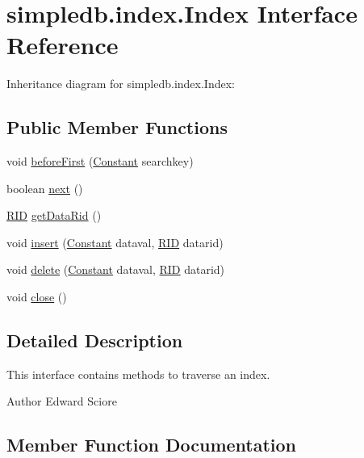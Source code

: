 \hypertarget{interfacesimpledb_1_1index_1_1Index}{}\section{simpledb.\+index.\+Index Interface Reference}
\label{interfacesimpledb_1_1index_1_1Index}


Inheritance diagram for simpledb.\+index.\+Index\+:
\subsection*{Public Member Functions}
\begin{DoxyCompactItemize}
\item 
void \hyperlink{interfacesimpledb_1_1index_1_1Index_a393ce322b5a7ffee20d8ff85abef7444}{before\+First} (\hyperlink{classsimpledb_1_1query_1_1Constant}{Constant} searchkey)
\item 
boolean \hyperlink{interfacesimpledb_1_1index_1_1Index_a38b2addb6813fbf1d94e77de2345724c}{next} ()
\item 
\hyperlink{classsimpledb_1_1record_1_1RID}{R\+ID} \hyperlink{interfacesimpledb_1_1index_1_1Index_aad4ee85740a0f5b3453bdf24e8b82615}{get\+Data\+Rid} ()
\item 
void \hyperlink{interfacesimpledb_1_1index_1_1Index_a7e72ba9fe47d6d7631e0ad3feee882d7}{insert} (\hyperlink{classsimpledb_1_1query_1_1Constant}{Constant} dataval, \hyperlink{classsimpledb_1_1record_1_1RID}{R\+ID} datarid)
\item 
void \hyperlink{interfacesimpledb_1_1index_1_1Index_a3bbe4098bf5422023391ce24f2e7df88}{delete} (\hyperlink{classsimpledb_1_1query_1_1Constant}{Constant} dataval, \hyperlink{classsimpledb_1_1record_1_1RID}{R\+ID} datarid)
\item 
void \hyperlink{interfacesimpledb_1_1index_1_1Index_aedde7a12ff7788c1dc00ef9404b4266e}{close} ()
\end{DoxyCompactItemize}


\subsection{Detailed Description}
This interface contains methods to traverse an index. \begin{DoxyAuthor}{Author}
Edward Sciore 
\end{DoxyAuthor}


\subsection{Member Function Documentation}
\mbox{\label{interfacesimpledb_1_1index_1_1Index_a393ce322b5a7ffee20d8ff85abef7444}} 
